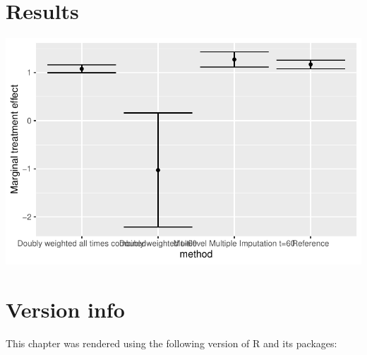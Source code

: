 \documentclass[
  letterpaper,
  DIV=11,
  numbers=noendperiod]{scrreprt}
\begin{document}
\hypertarget{results-2}{%
\section{Results}\label{results-2}}

\includegraphics{chapter_12_files/figure-pdf/unnamed-chunk-16-1.pdf}

\hypertarget{version-info-5}{%
\section*{Version info}\label{version-info-5}}


This chapter was rendered using the following version of R and its
packages:
\end{document}
